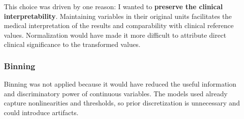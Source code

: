 This choice was driven by one reason: I wanted to \textbf{preserve the clinical interpretability}. Maintaining variables in their original units facilitates the medical interpretation of the results and comparability with clinical reference values. Normalization would have made it more difficult to attribute direct clinical significance to the transformed values.

\subsubsection{Binning}
Binning was not applied because it would have reduced the useful information and discriminatory power of continuous variables. The models used already capture nonlinearities and thresholds, so prior discretization is unnecessary and could introduce artifacts.

\newpage

